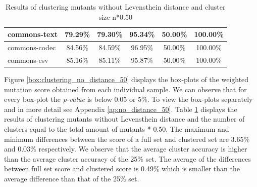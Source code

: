 \documentclass[../../main]{subfiles}
\begin{document}
\begin{table}[htb]
\begin{tabular}{|l|c|c|c|c|c|}
commons-text                  & 79.29\%                                                                                 & 79.30\%                                                                                     & 95.34\%                                                                              & 50.00\%                                                                               & 100.00\%                                                                             \\ \hline
commons-codec                 & 84.56\%                                                                                 & 84.59\%                                                                                     & 96.95\%                                                                              & 50.00\%                                                                               & 100.00\%                                                                             \\ \hline
commons-csv                   & 85.16\%                                                                                 & 85.11\%                                                                                     & 95.87\%                                                                              & 50.00\%                                                                               & 100.00\%                                                                             \\ \hline
\end{tabular}
\caption{\label{tab:clustering_no_distance_50}Results of clustering mutants without Levensthein distance and cluster size n*0.50}
\end{table}
\FloatBarrier

Figure \ref{box:clustering_no_distance_50} displays the box-plots of the weighted mutation score obtained from each individual sample. 
We can observe that for every box-plot the \textit{p-value} is below 0.05 or 5\%.
To view the box-plots separately and in more detail see Appendix \ref{ap:no_distance_50}.
Table \ref{tab:clustering_no_distance_50} displays the results of clustering mutants without Levensthein distance and the number of clusters equal to the total amount of mutants * 0.50.
The maximum and minimum differences between the score of a full set and clustered set are 3.65\% and 0.03\% respectively.
We observe that the average cluster accuracy is higher than the average cluster accuracy of the 25\% set. 
The average of the differences between full set score and clustered score is 0.49\% which is smaller than the average difference than that of the 25\% set.
\end{document}

